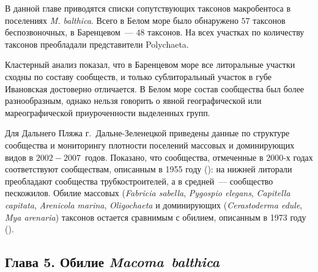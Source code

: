 {В данной главе приводятся списки сопутствующих таксонов макробентоса в поселениях {\it M. balthica}.
Всего в Белом море было обнаружено $57$ таксонов беспозвоночных, в Баренцевом~--- $48$ таксонов.
На всех участках по количеству таксонов преобладали представители Polychaeta.

Кластерный анализ показал, что в Баренцевом море все литоральные участки сходны по составу сообществ, и только сублиторальный участок в губе Ивановская достоверно отличается.
В Белом море состав сообщества был более разнообразным, однако нельзя говорить о явной географической или мареографической приуроченности выделенных групп.

Для Дальнего Пляжа г.~Дальне-Зеленецкой приведены данные по структуре сообщества и мониторингу плотности поселений массовых и доминирующих видов в $2002 - 2007$~годов.
Показано, что сообщества, отмеченные в 2000-х годах соответствуют сообществам, описанным в 1955 году (\cite{Matveeva_et_al_1955}): на нижней литорали преобладают сообщества трубкостроителей, а в средней~--- сообщество пескожилов. 
Обилие массовых ({\it Fabricia sabella}, {\it Pygospio elegans}, {\it Capitella capitata}, {\it Arenicola marina}, {\it Oligochaeta} и доминирующих ({\it Cerastoderma edule}, {\it Mya arenaria}) таксонов остается сравнимым с обилием, описанным в 1973 году (\cite{Agarova_et_al_1976}).

\subsection*{Глава 5. Обилие \textit{Macoma~balthica}}

}
